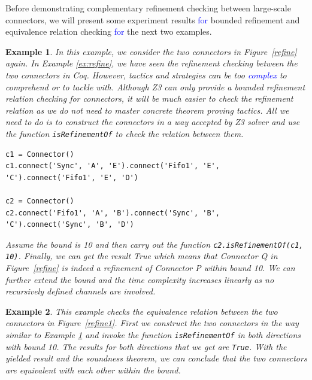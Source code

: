\documentclass[preprint,3p]{elsarticle}
\newcommand{\liyi}[1]{\textcolor{blue}{#1}}
\newtheorem{example}{Example}[section]
\begin{document}
Before demonstrating complementary refinement checking between large-scale connectors, we will present some experiment results \liyi{for} bounded refinement and equivalence relation checking \liyi{for} the next two examples.
\begin{example}
\label{ex:equivalence1}
In this example, we consider the two connectors in Figure~\ref{refine} again. In  Example \ref{ex:refine}, we have seen the refinement checking between the two connectors in Coq. However, tactics and strategies can be too \liyi{complex} to comprehend or to tackle with. Although Z3 can only provide a bounded refinement relation checking for connectors, it will be much easier to check the refinement relation as we do not need to master concrete theorem proving tactics. All we need to do is to construct the connectors in a way accepted by Z3 solver and use the function \texttt{isRefinementOf} to check the relation between them.
\begin{lstlisting}
c1 = Connector()
c1.connect('Sync', 'A', 'E').connect('Fifo1', 'E', 'C').connect('Fifo1', 'E', 'D')

c2 = Connector()
c2.connect('Fifo1', 'A', 'B').connect('Sync', 'B', 'C').connect('Sync', 'B', 'D')
\end{lstlisting}
Assume the bound is 10 and then carry out the function \texttt{c2.isRefinementOf(c1, 10)}. Finally, we can get the result \emph{True} which means that \emph{Connector Q} in Figure~\ref{refine} is indeed a refinement of \emph{Connector P} within bound 10. We can further extend the bound and the time complexity increases linearly as no recursively defined channels are involved.
\end{example}

\begin{example}
This example checks the equivalence relation between the two connectors in Figure~\ref{refine1}. First we construct the two connectors in the way similar to Example \ref{ex:equivalence1} and invoke the function \texttt{isRefinementOf} in both directions with bound 10. The results for both directions that we get are \texttt{True}. With the yielded result and the soundness theorem, we can conclude that the two connectors are equivalent with each other within the bound.
\end{example}
\end{document}
